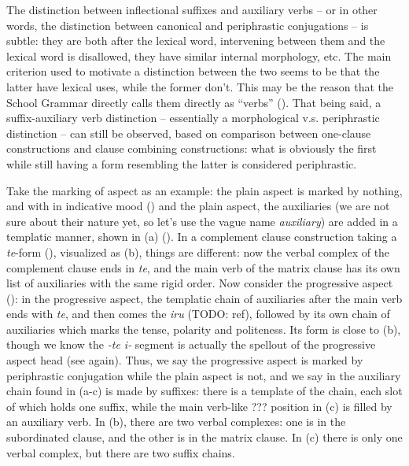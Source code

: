 \documentclass[UTF8, a4paper, oneside, scheme=plain]{ctexrep}
\newcommand*{\term}[1]{\emph{#1}}
\newcommand{\corpus}[1]{\emph{#1}}
\begin{document}
The distinction between inflectional suffixes and auxiliary verbs -- 
or in other words, the distinction between canonical and periphrastic conjugations -- 
is subtle: they are both after the lexical word,
intervening between them and the lexical word is disallowed, 
they have similar internal morphology, etc.
The main criterion used to motivate a distinction between the two 
seems to be that the latter have lexical uses, while the former don't.
This may be the reason that the School Grammar directly calls them directly as ``verbs'' 
().
That being said, a suffix-auxiliary verb distinction 
-- essentially a morphological v.s. periphrastic distinction -- 
can still be observed,
based on comparison between one-clause constructions 
and clause combining constructions:
what is obviously the first while still having a form resembling the latter is considered periphrastic.

Take the marking of aspect as an example:
the plain aspect is marked by nothing, 
and with in indicative mood () and the plain aspect,
the auxiliaries (we are not sure about their nature yet, so let's use the vague name \term{auxiliary}) 
are added in a templatic manner, shown in (a) 
().
In a complement clause construction taking a \corpus{te}-form (),
visualized as (b),
things are different: now the verbal complex of the complement clause ends in \corpus{te},
and the main verb of the matrix clause has its own list of auxiliaries with the same rigid order.
Now consider the progressive aspect ():
in the progressive aspect, the templatic chain of auxiliaries after the main verb ends with \corpus{te},
and then comes the \corpus{iru} (TODO: ref), followed by its own chain of auxiliaries 
which marks the tense, polarity and politeness.
Its form is close to (b),
though we know the \corpus{-te i-} segment is actually the spellout of the progressive aspect head 
(see  again).
Thus, we say the progressive aspect is marked by periphrastic conjugation 
while the plain aspect is not,
and we say in the auxiliary chain found in 
(a-c)
is made by suffixes: 
there is a template of the chain, each slot of which holds one suffix,
while the main verb-like ??? position in (c) 
is filled by an auxiliary verb.
In (b),
there are two verbal complexes:
one is in the subordinated clause,
and the other is in the matrix clause.
In (c)
there is only one verbal complex,
but there are two suffix chains.
\end{document}
